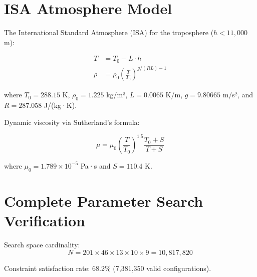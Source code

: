 \documentclass[11pt,a4paper]{article}
\begin{document}
\appendix

\section{ISA Atmosphere Model}

The International Standard Atmosphere (ISA) for the troposphere ($h < 11,000$ m):

\begin{align}
T &= T_0 - L \cdot h \\
\rho &= \rho_0 \left(\frac{T}{T_0}\right)^{g/(RL) - 1}
\end{align}

where $T_0 = 288.15$ K, $\rho_0 = 1.225$ kg/m³, $L = 0.0065$ K/m, $g = 9.80665$ m/s², and $R = 287.058$ J/(kg·K).

Dynamic viscosity via Sutherland's formula:

\begin{equation}
\mu = \mu_0 \left(\frac{T}{T_0}\right)^{1.5} \frac{T_0 + S}{T + S}
\end{equation}

where $\mu_0 = 1.789 \times 10^{-5}$ Pa·s and $S = 110.4$ K.

\section{Complete Parameter Search Verification}

Search space cardinality:
\begin{equation}
N = 201 \times 46 \times 13 \times 10 \times 9 = 10,817,820
\end{equation}

Constraint satisfaction rate: 68.2\% (7,381,350 valid configurations).
\end{document}
